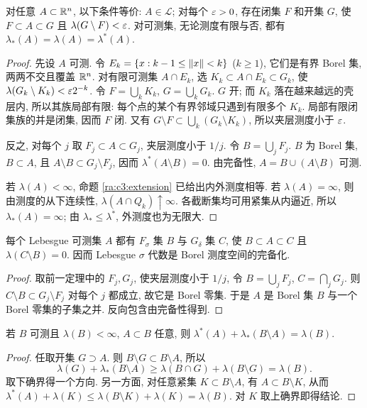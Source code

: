 \begin{theorem}[正则逼近]\label{ra:c3:regular}
对任意 $A\subset\mathbb R^n$, 以下条件等价: $A\in\mathcal L$; 对每个 $\varepsilon>0$, 存在闭集 $F$ 和开集 $G$, 使 $F\subset A\subset G$ 且 $\lambda(G\setminus F)<\varepsilon$. 对可测集, 无论测度有限与否, 都有 $\lambda_*(A)=\lambda(A)=\lambda^*(A)$.
\end{theorem}
\begin{proof}
先设 $A$ 可测. 令 $E_k=\{x:k-1\le\lVert x\rVert<k\}$ ($k\ge1$), 它们是有界 Borel 集, 两两不交且覆盖 $\mathbb R^n$. 对有限可测集 $A\cap E_k$, 选 $K_k\subset A\cap E_k\subset G_k$, 使 $\lambda(G_k\setminus K_k)<\varepsilon2^{-k}$. 令 $F=\bigcup_kK_k$, $G=\bigcup_kG_k$. $G$ 开; 而 $K_k$ 落在越来越远的壳层内, 所以其族局部有限: 每个点的某个有界邻域只遇到有限多个 $K_k$. 局部有限闭集族的并是闭集, 因而 $F$ 闭. 又有 $G\setminus F\subset\bigcup_k(G_k\setminus K_k)$, 所以夹层测度小于 $\varepsilon$.

反之, 对每个 $j$ 取 $F_j\subset A\subset G_j$, 夹层测度小于 $1/j$. 令 $B=\bigcup_jF_j$. $B$ 为 Borel 集, $B\subset A$, 且 $A\setminus B\subset G_j\setminus F_j$, 因而 $\lambda^*(A\setminus B)=0$. 由完备性, $A=B\cup(A\setminus B)$ 可测.

若 $\lambda(A)<\infty$, 命题 \ref{ra:c3:extension} 已给出内外测度相等. 若 $\lambda(A)=\infty$, 则由测度的从下连续性, $\lambda(A\cap Q_k)\uparrow\infty$. 各截断集均可用紧集从内逼近, 所以 $\lambda_*(A)=\infty$; 由 $\lambda_*\le\lambda^*$, 外测度也为无限大.
\end{proof}

\begin{corollary}\label{ra:c3:borelcompletion}
每个 Lebesgue 可测集 $A$ 都有 $F_\sigma$ 集 $B$ 与 $G_\delta$ 集 $C$, 使 $B\subset A\subset C$ 且 $\lambda(C\setminus B)=0$. 因而 Lebesgue $\sigma$ 代数是 Borel 测度空间的完备化.
\end{corollary}
\begin{proof}
取前一定理中的 $F_j,G_j$, 使夹层测度小于 $1/j$, 令 $B=\bigcup_jF_j$, $C=\bigcap_jG_j$. 则 $C\setminus B\subset G_j\setminus F_j$ 对每个 $j$ 都成立, 故它是 Borel 零集. 于是 $A$ 是 Borel 集 $B$ 与一个 Borel 零集的子集之并. 反向包含由完备性得到.
\end{proof}


\begin{lemma}\label{ra:c3:complementidentity}
若 $B$ 可测且 $\lambda(B)<\infty$, $A\subset B$ 任意, 则 $\lambda^*(A)+\lambda_*(B\setminus A)=\lambda(B)$.
\end{lemma}
\begin{proof}
任取开集 $G\supset A$. 则 $B\setminus G\subset B\setminus A$, 所以
\[
 \lambda(G)+\lambda_*(B\setminus A)
 \ge\lambda(B\cap G)+\lambda(B\setminus G)=\lambda(B).
\]
取下确界得一个方向. 另一方面, 对任意紧集 $K\subset B\setminus A$, 有 $A\subset B\setminus K$, 从而 $\lambda^*(A)+\lambda(K)\le\lambda(B\setminus K)+\lambda(K)=\lambda(B)$. 对 $K$ 取上确界即得结论.
\end{proof}

